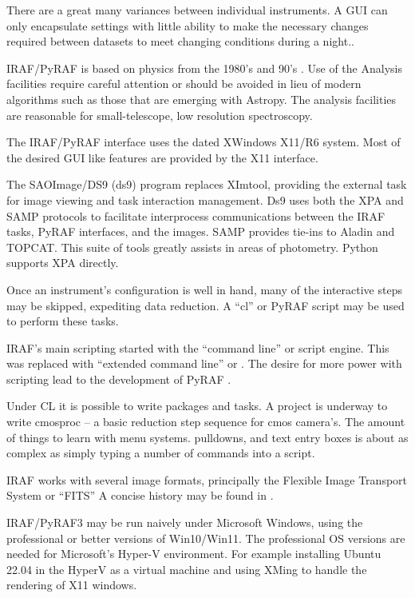 There are a great many variances between individual instruments. A GUI
can only encapsulate settings with little ability to make the
necessary changes required between datasets to meet changing
conditions during a night.\dhl{[ Managing these differences are covered in
Section \ref{sec:IRAFGUINotes}}.

IRAF/PyRAF is based on physics from the 1980's and
90's \cite{1973asqu.book.....A}. Use of the Analysis facilities require
careful attention or should be avoided in lieu of modern algorithms
such as those that are emerging with Astropy. The analysis facilities
are reasonable for small-telescope, low resolution spectroscopy.

The IRAF/PyRAF interface uses the dated XWindows X11/R6 system. Most
of the desired GUI like features are provided by the X11 interface.

The SAOImage/DS9 (ds9) \cite{1990BAAS...22..935V}
\cite{2019zndo...2530958J} program replaces XImtool, providing the
external task for image viewing and task interaction management. Ds9
uses both the XPA and SAMP protocols to facilitate interprocess
communications between the IRAF tasks, PyRAF interfaces, and the
images. SAMP provides tie-ins to Aladin and TOPCAT. This suite of
tools greatly assists in areas of photometry.  Python supports XPA
directly.

Once an instrument's configuration is well in hand, many of the interactive
steps may be skipped, expediting data reduction. A ``cl'' or PyRAF script
may be used to perform these tasks.

IRAF's main scripting started with the ``command line'' or  script
engine. This was replaced with ``extended command line'' or .
The desire for more power with scripting lead to the development
of PyRAF \cite{2006hstc.conf..437G,PyrafProgrammersGuide}. 

Under CL it is possible to write packages and tasks. A project is underway
to write cmosproc -- a basic reduction step sequence for cmos camera's.
The amount of things to learn with menu systems. pulldowns, and text
entry boxes is about as complex as simply typing a number of commands
into a script.

IRAF works with several image formats, principally the Flexible Image
Transport System or ``FITS'' A concise history may be found in \cite{FITSBirthday}.


IRAF/PyRAF3 may be run naively under Microsoft Windows, using the
professional or better versions of Win10/Win11. The professional OS
versions are needed for Microsoft's Hyper-V environment. For example
installing Ubuntu 22.04 in the HyperV as a virtual machine and using XMing
to handle the rendering of X11 windows.

